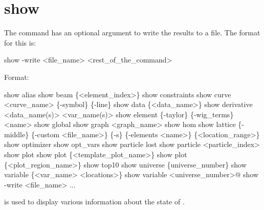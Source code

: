 \section{show}
\label{s:show}

The  command has an optional argument to write the results to a file.
The format for this is:
\begin{example}
  show -write <file_name> <rest_of_the_command>
\end{example}

Format:
\begin{example}
  show alias 
  show beam \{<element_index>\}
  show constraints
  show curve <curve_name> \{-symbol\} \{-line\}
  show data \{<data_name>\} 
  show derivative <data_name(s)> <var_name(s)>
  show element \{-taylor\} \{-wig_terms\} <name>
  show global
  show graph <graph_name>
  show hom
  show lattice \{-middle\} \{-custom <file_name>\} \{-s\} \{-elements <name>\} \{<location_range>\}
  show optimizer
  show opt_vars
  show particle lost
  show particle <particle_index>
  show plot
  show plot \{<template_plot_name>\}
  show plot \{<plot_region_name>\}
  show top10
  show universe \{universe_number\}
  show variable \{<var_name> <locations>\}
  show variable <universe_number>@
  show -write <file_name> ...
\end{example}

\vskip 0.2in 
 is used to display various information about
the state of \tao. 

